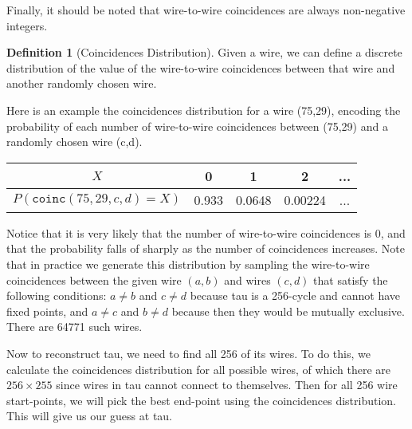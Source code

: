 \documentclass[12pt]{article}
\theoremstyle{definition}
\newtheorem{definition}{Definition}%
\theoremstyle{remark}
\theoremstyle{remark}
\begin{document}
\par
Finally, it should be noted that wire-to-wire coincidences are always non-negative integers.



\begin{definition}[Coincidences Distribution]
	Given a wire, we can define a discrete distribution of the value of the wire-to-wire coincidences between that wire and another randomly chosen wire.
\end{definition}
\par
Here is an example the coincidences distribution for a wire (75,29), encoding the probability of each number of wire-to-wire coincidences between (75,29) and a randomly chosen wire (c,d).
\begin{center}
\begin{tabular}{|c|c|c|c|c|}
\hline
$X$ & 0 & 1 & 2 & ... \\
\hline 
$P(\texttt{coinc}(75,29,c,d)=X)$ & 0.933 & 0.0648 & 0.00224 & ... \\

\hline
\end{tabular}
\end{center}
Notice that it is very likely that the number of wire-to-wire coincidences is 0, and that the probability falls of sharply as the number of coincidences increases. Note that in practice we generate this distribution by sampling the wire-to-wire coincidences between the given wire $(a,b)$ and wires $(c,d)$ that satisfy the following conditions: $a\neq b$ and $c\neq d$ because tau is a 256-cycle and cannot have fixed points, and $a\neq c$ and $b \neq d$ because then they would be mutually exclusive. There are 64771 such wires. 

\par
Now to reconstruct tau, we need to find all 256 of its wires. To do this, we calculate the coincidences distribution for all possible wires, of which there are $256 \times 255$ since wires in tau cannot connect to themselves. Then for all 256 wire start-points, we will pick the best end-point using the coincidences distribution. This will give us our guess at tau.
\end{document}
